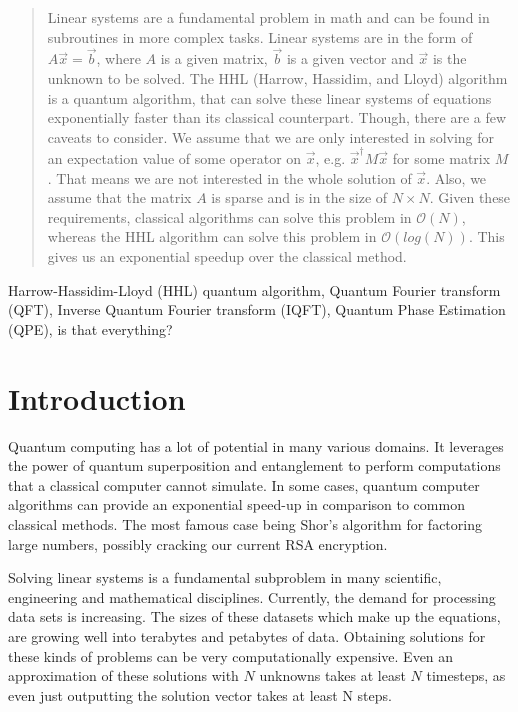 


\begin{abstract}
Linear systems are a fundamental problem in math and can be found in subroutines in more complex tasks.
Linear systems are in the form of $A \vec x = \vec b$, where $A$ is a given matrix, $\vec b$ is a given vector and $\vec x$ is the unknown to be solved.
The HHL (Harrow, Hassidim, and Lloyd) algorithm is a quantum algorithm, that can solve these linear systems of equations exponentially faster than its classical counterpart. 
Though, there are a few caveats to consider.
We assume that we are only interested in solving for an expectation value of some operator on $\vec x$, e.g. $\vec{x}^\dagger M \vec x$ for some matrix $M$.
That means we are not interested in the whole solution of $\vec x$.
Also, we assume that the matrix $A$ is sparse and is in the size of $N\times N$. 
Given these requirements, classical algorithms can solve this problem in $\mathcal{O}(N )$, whereas the HHL algorithm can solve this problem in $\mathcal{O}(log (N) )$.
This gives us an exponential speedup over the classical method.
\end{abstract}

\begin{IEEEkeywords}
Harrow-Hassidim-Lloyd (HHL) quantum algorithm, 
Quantum Fourier transform (QFT), 
Inverse Quantum Fourier transform (IQFT), 
Quantum Phase Estimation (QPE),
is that everything?
\end{IEEEkeywords}



\section{Introduction}


Quantum computing has a lot of potential in many various domains. 
It leverages the power of quantum superposition and entanglement to perform computations that a classical computer cannot simulate.
In some cases, quantum computer algorithms can provide an exponential speed-up in comparison to common classical methods.
The most famous case being Shor's algorithm for factoring large numbers, possibly cracking our current RSA encryption.

Solving linear systems is a fundamental subproblem in many scientific, engineering and mathematical disciplines. 
Currently, the demand for processing data sets is increasing. 
The sizes of these datasets which make up the equations, are growing well into terabytes and petabytes of data.
Obtaining solutions for these kinds of problems can be very computationally expensive.
Even an approximation of these solutions with $N$ unknowns takes at least $N$ timesteps, as even just outputting the solution vector takes at least N steps.

